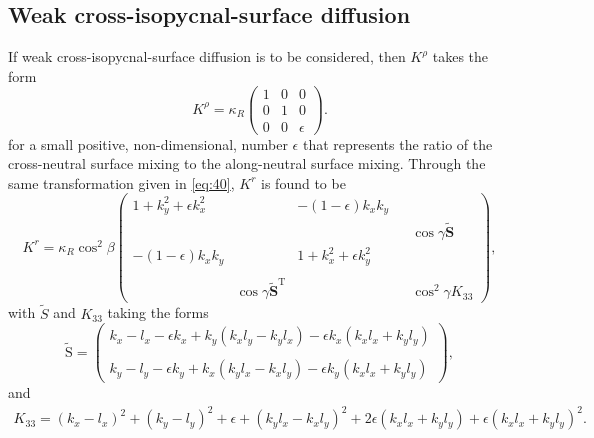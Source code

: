 \documentclass[12pt]{report}
\def\tilde{\widetilde}
\def\bs{\boldsymbol}
\def\Sb{\bs{\mathrm{S}}}
\begin{document}
\subsection{Weak cross-isopycnal-surface diffusion}
If weak cross-isopycnal-surface diffusion is to be considered, then
$K^\rho$ takes the form
\begin{equation}
\label{eq:48}
  K^\rho = \kappa_R \left(
    \begin{matrix}
      1 & 0 & 0\\
      0 & 1 & 0\\
      0 & 0 & \epsilon
    \end{matrix}\right).
\end{equation}
for a small positive, non-dimensional, number $\epsilon$ that represents the ratio of the cross-neutral 
surface mixing to the along-neutral surface mixing. Through the same transformation
given in \eqref{eq:40}, $K^r$ is found to be
\begin{equation}
\label{eq:50}
  K^r = \kappa_R \cos^2\beta\left(
    \begin{matrix}
      1 + k_y^2 + \epsilon k_x^2& { }  &  -(1-\epsilon)k_xk_y & { } & { }\\
          { }   &     { }   & { } & { } & \cos\gamma{\tilde{\mathbf{S}}}\\
      -(1-\epsilon)k_xk_y & { } & 1 + k_x^2+\epsilon k_y^2 & { } & { }\\
         { } & { } & { } & { } & { } \\
         { } & \cos\gamma\tilde{\mathbf{S}}^\textrm{T} & { } & { } &
         \cos^2\gamma K_{33}
    \end{matrix}\right),
\end{equation}
with $\tilde S$ and $K_{33}$ taking the forms
\begin{equation*}
 \tilde{\Sb} = \left(\begin{matrix}k_x- l_x -\epsilon k_x + k_y(k_xl_y - k_yl_x) -
  \epsilon k_x(k_xl_x+k_yl_y) \\
 \\ 
  k_y-l_y - \epsilon k_y
    + k_x(k_yl_x - k_xl_y) - \epsilon
    k_y(k_xl_x+k_yl_y)\end{matrix}\right),
\end{equation*}
and 
\begin{multline*}
K_{33} = (k_x - l_x)^2 + (k_y - l_y)^2 +\epsilon +  (k_yl_x - k_xl_y)^2 + 
2\epsilon(k_xl_x+k_yl_y) + \epsilon(k_xl_x+k_yl_y)^2.
\end{multline*}
\end{document}
